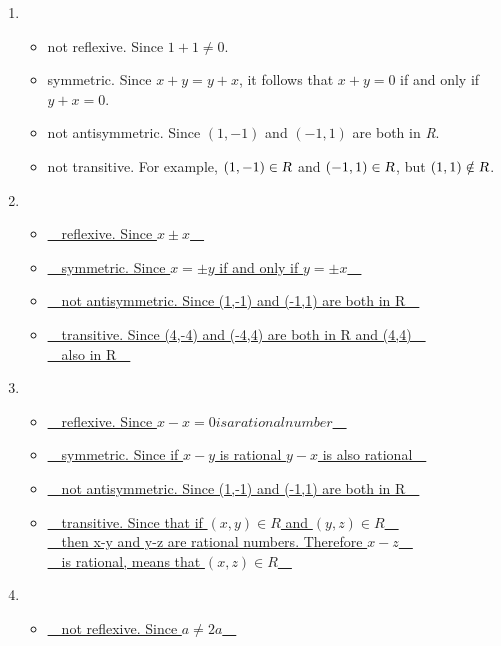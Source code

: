 \documentclass[sigconf]{acmart}
\begin{document}
\begin{enumerate}[label=(\alph*)]
    \item 
    \begin{itemize}
        \item not reflexive. Since $1 + 1 \neq 0$.
        \item symmetric. Since $x + y = y + x$, it follows that $x + y = 0$ if and only if $y + x = 0$.
        \item not antisymmetric. Since $(1, -1)$ and $(-1, 1)$ are both in \textsl{R}.
        \item not transitive. For example, $(1, -1) \in \textsl{R}$ and $(-1, 1) \in \textsl{R}$, but $(1, 1) \notin \textsl{R}$.
    \end{itemize}
    \item 
    \begin{itemize}
        \item \underline{~~reflexive. Since $x \pm x$~~}
        \item \underline{~~symmetric. Since $x = \pm y$ if and only if $y = \pm x$~~}
        \item \underline{~~not antisymmetric. Since (1,-1) and (-1,1) are both in R~~}
        \item \underline{~~transitive. Since (4,-4) and (-4,4) are both in R and (4,4)~~}\\
        \underline{~~also in R~~}
    \end{itemize}
    \item 
    \begin{itemize}
        \item \underline{~~reflexive. Since $x-x=0 is a rational number$~~}
        \item \underline{~~symmetric. Since if $x-y$ is rational $y-x$ is also rational~~}
        \item \underline{~~not antisymmetric. Since (1,-1) and (-1,1) are both in R~~}
        \item \underline{~~transitive. Since that if $(x,y) \in R$ and $(y,z) \in R$~~}\\  
        \underline{~~then x-y and y-z are rational numbers. Therefore $x-z$~~ }\\
        \underline{~~is rational, means that $(x,z) \in R$~~}
    \end{itemize}
    \item 
    \begin{itemize}
        \item \underline{~~not reflexive. Since $a \neq 2a$~~}

\end{itemize}
\end{enumerate}
\end{document}
